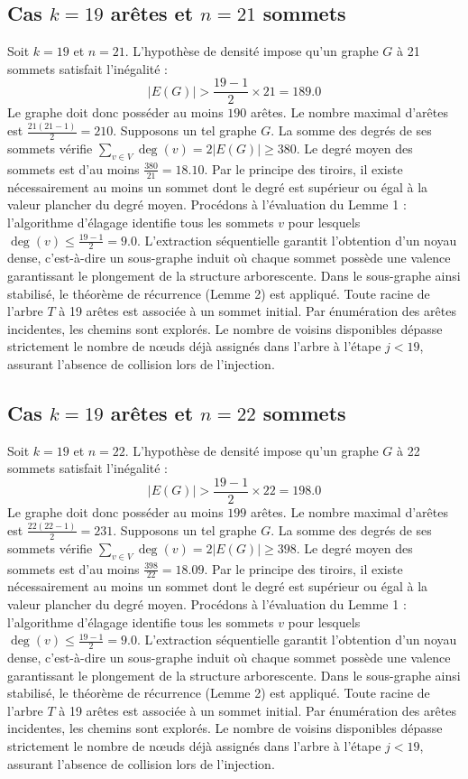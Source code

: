 \documentclass[12pt,a4paper]{article}
\begin{document}
\subsection{Cas $k = 19$ arêtes et $n = 21$ sommets}
Soit $k = 19$ et $n = 21$. L'hypothèse de densité impose qu'un graphe $G$ à 21 sommets satisfait l'inégalité :
$$ |E(G)| > \frac{19-1}{2} \times 21 = 189.0 $$
Le graphe doit donc posséder au moins $190$ arêtes. Le nombre maximal d'arêtes est $\frac{21(21-1)}{2} = 210$.
Supposons un tel graphe $G$. La somme des degrés de ses sommets vérifie $\sum_{v \in V} \deg(v) = 2|E(G)| \geq 380$.
Le degré moyen des sommets est d'au moins $\frac{380}{21} = 18.10$.
Par le principe des tiroirs, il existe nécessairement au moins un sommet dont le degré est supérieur ou égal à la valeur plancher du degré moyen.
Procédons à l'évaluation du Lemme 1 : l'algorithme d'élagage identifie tous les sommets $v$ pour lesquels $\deg(v) \leq \frac{19-1}{2} = 9.0$.
L'extraction séquentielle garantit l'obtention d'un noyau dense, c'est-à-dire un sous-graphe induit où chaque sommet possède une valence garantissant le plongement de la structure arborescente.
Dans le sous-graphe ainsi stabilisé, le théorème de récurrence (Lemme 2) est appliqué. Toute racine de l'arbre $T$ à 19 arêtes est associée à un sommet initial. Par énumération des arêtes incidentes, les chemins sont explorés. Le nombre de voisins disponibles dépasse strictement le nombre de nœuds déjà assignés dans l'arbre à l'étape $j < 19$, assurant l'absence de collision lors de l'injection.

\subsection{Cas $k = 19$ arêtes et $n = 22$ sommets}
Soit $k = 19$ et $n = 22$. L'hypothèse de densité impose qu'un graphe $G$ à 22 sommets satisfait l'inégalité :
$$ |E(G)| > \frac{19-1}{2} \times 22 = 198.0 $$
Le graphe doit donc posséder au moins $199$ arêtes. Le nombre maximal d'arêtes est $\frac{22(22-1)}{2} = 231$.
Supposons un tel graphe $G$. La somme des degrés de ses sommets vérifie $\sum_{v \in V} \deg(v) = 2|E(G)| \geq 398$.
Le degré moyen des sommets est d'au moins $\frac{398}{22} = 18.09$.
Par le principe des tiroirs, il existe nécessairement au moins un sommet dont le degré est supérieur ou égal à la valeur plancher du degré moyen.
Procédons à l'évaluation du Lemme 1 : l'algorithme d'élagage identifie tous les sommets $v$ pour lesquels $\deg(v) \leq \frac{19-1}{2} = 9.0$.
L'extraction séquentielle garantit l'obtention d'un noyau dense, c'est-à-dire un sous-graphe induit où chaque sommet possède une valence garantissant le plongement de la structure arborescente.
Dans le sous-graphe ainsi stabilisé, le théorème de récurrence (Lemme 2) est appliqué. Toute racine de l'arbre $T$ à 19 arêtes est associée à un sommet initial. Par énumération des arêtes incidentes, les chemins sont explorés. Le nombre de voisins disponibles dépasse strictement le nombre de nœuds déjà assignés dans l'arbre à l'étape $j < 19$, assurant l'absence de collision lors de l'injection.
\end{document}
